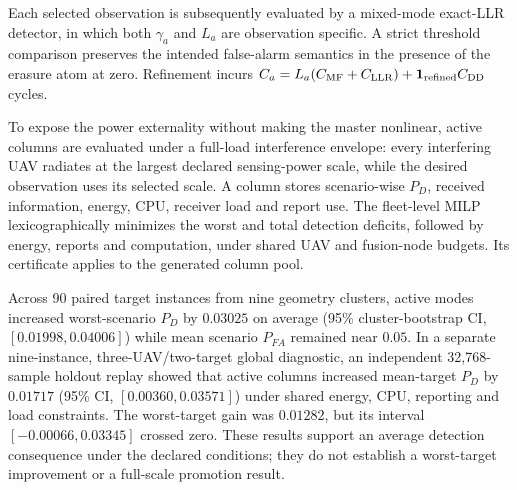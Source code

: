 Each selected observation is subsequently evaluated by a mixed-mode exact-LLR
detector, in which both $\gamma_a$ and $L_a$ are observation specific.  A
strict threshold comparison preserves the intended false-alarm semantics in
the presence of the erasure atom at zero.  Refinement incurs
$C_a=L_a(C_{\rm MF}+C_{\rm LLR})+\mathbf{1}_{\rm refined}C_{\rm DD}$ cycles.

To expose the power externality without making the master nonlinear, active
columns are evaluated under a full-load interference envelope: every
interfering UAV radiates at the largest declared sensing-power scale, while
the desired observation uses its selected scale.  A column stores
scenario-wise $P_D$, received information, energy, CPU, receiver load and
report use.  The fleet-level MILP lexicographically minimizes the worst and
total detection deficits, followed by energy, reports and computation, under
shared UAV and fusion-node budgets.  Its certificate applies to the generated
column pool.

Across 90 paired target instances from nine geometry clusters, active modes
increased worst-scenario $P_D$ by $0.03025$ on average (95\% cluster-bootstrap
CI, $[0.01998,0.04006]$) while mean scenario $P_{FA}$ remained near $0.05$.
In a separate nine-instance, three-UAV/two-target global diagnostic, an
independent 32,768-sample holdout replay showed that active columns increased
mean-target $P_D$ by $0.01717$ (95\% CI, $[0.00360,0.03571]$) under shared
energy, CPU, reporting and load constraints.  The worst-target gain was
$0.01282$, but its interval $[-0.00066,0.03345]$ crossed zero.  These results
support an average detection consequence under the declared conditions; they
do not establish a worst-target improvement or a full-scale promotion result.
